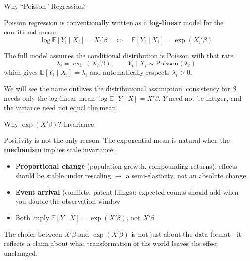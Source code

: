 \documentclass[aspectratio=169, handout, t]{beamer}
\numberwithin{equation}{section}
\begin{document}

\begin{frame}{Why ``Poisson'' Regression?}

Poisson regression is conventionally written as a \textbf{log-linear} model for the conditional mean:
\[
\log \mathbb{E}[Y_i \mid X_i] = X_i'\beta
\quad\Longleftrightarrow\quad
\mathbb{E}[Y_i \mid X_i] = \exp(X_i'\beta)
\]

\pause

\bigskip

The full model assumes the conditional distribution is Poisson with that rate:
\[
\lambda_i = \exp(X_i'\beta), \qquad Y_i \mid X_i \sim \text{Poisson}(\lambda_i)
\]
which gives $\mathbb{E}[Y_i\mid X_i] = \lambda_i$ and automatically respects $\lambda_i > 0$.

\pause

\bigskip

We will see the name outlives the distributional assumption: consistency for $\beta$ needs only the log-linear mean $\log \mathbb{E}[Y\mid X] = X'\beta$. $Y$ need not be integer, and the variance need not equal the mean.

\end{frame}


\begin{frame}{Why $\exp(X'\beta)$? Invariance}

Positivity is not the only reason. The exponential mean is natural when the \textbf{mechanism} implies scale invariance:\pause

\begin{itemize}
    \item \textbf{Proportional change} (population growth, compounding returns): effects should be stable under rescaling $\to$ a semi-elasticity, not an absolute change\pause
    \item \textbf{Event arrival} (conflicts, patent filings): expected counts should add when you double the observation window\pause
    \item Both imply $\mathbb{E}[Y\mid X]=\exp(X'\beta)$, not $X'\beta$
\end{itemize}

\pause

\begin{tcolorbox}[colback=blue!5, colframe=blue!50, boxsep=2pt, top=2pt, bottom=2pt]
The choice between $X'\beta$ and $\exp(X'\beta)$ is not just about the data format---it reflects a claim about what transformation of the world leaves the effect unchanged.
\end{tcolorbox}

\end{frame}
\end{document}
